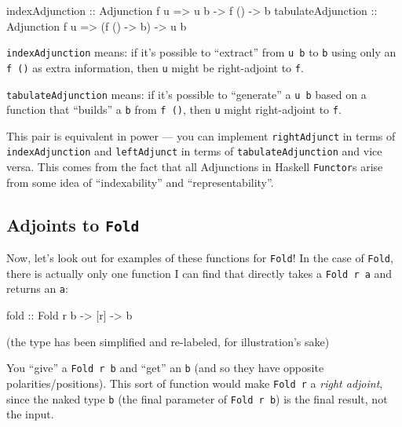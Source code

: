 \documentclass[]{article}
\newenvironment{Shaded}{}{}
\newcommand{\DataTypeTok}[1]{\textcolor[rgb]{0.56,0.13,0.00}{#1}}
\newcommand{\NormalTok}[1]{#1}
\newcommand{\OtherTok}[1]{\textcolor[rgb]{0.00,0.44,0.13}{#1}}
\begin{document}
\begin{Shaded}
\begin{Highlighting}[]
\OtherTok{indexAdjunction    ::} \DataTypeTok{Adjunction}\NormalTok{ f u }\OtherTok{=>}\NormalTok{ u b }\OtherTok{{-}>}\NormalTok{ f () }\OtherTok{{-}>}\NormalTok{ b}
\OtherTok{tabulateAdjunction ::} \DataTypeTok{Adjunction}\NormalTok{ f u }\OtherTok{=>}\NormalTok{ (f () }\OtherTok{{-}>}\NormalTok{ b) }\OtherTok{{-}>}\NormalTok{ u b}
\end{Highlighting}
\end{Shaded}

\texttt{indexAdjunction} means: if it's possible to ``extract'' from
\texttt{u\ b} to \texttt{b} using only an \texttt{f\ ()} as extra information,
then \texttt{u} might be right-adjoint to \texttt{f}.

\texttt{tabulateAdjunction} means: if it's possible to ``generate'' a
\texttt{u\ b} based on a function that ``builds'' a \texttt{b} from
\texttt{f\ ()}, then \texttt{u} might right-adjoint to \texttt{f}.

This pair is equivalent in power --- you can implement \texttt{rightAdjunct} in
terms of \texttt{indexAdjunction} and \texttt{leftAdjunct} in terms of
\texttt{tabulateAdjunction} and vice versa. This comes from the fact that all
Adjunctions in Haskell \texttt{Functor}s arise from some idea of
``indexability'' and ``representability''.

\hypertarget{adjoints-to-fold}{%
\subsection{\texorpdfstring{Adjoints to
\texttt{Fold}}{Adjoints to Fold}}\label{adjoints-to-fold}}

Now, let's look out for examples of these functions for \texttt{Fold}! In the
case of \texttt{Fold}, there is actually only one function I can find that
directly takes a \texttt{Fold\ r\ a} and returns an \texttt{a}:

\begin{Shaded}
\begin{Highlighting}[]
\OtherTok{fold ::} \DataTypeTok{Fold}\NormalTok{ r b }\OtherTok{{-}>}\NormalTok{ [r] }\OtherTok{{-}>}\NormalTok{ b}
\end{Highlighting}
\end{Shaded}

(the type has been simplified and re-labeled, for illustration's sake)

You ``give'' a \texttt{Fold\ r\ b} and ``get'' an \texttt{b} (and so they have
opposite polarities/positions). This sort of function would make
\texttt{Fold\ r} a \emph{right adjoint}, since the naked type \texttt{b} (the
final parameter of \texttt{Fold\ r\ b}) is the final result, not the input.
\end{document}
